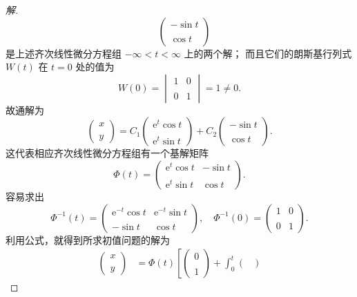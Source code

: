 \begin{enumerate}
\begin{proof}[解]
\[\quad\begin{pmatrix}-\sin t \\ \\ \cos t\end{pmatrix}\]
是上述齐次线性微分方程组 $-\infty<t<\infty$ 上的两个解；
而且它们的朗斯基行列式 $W(t)$ 在 $t=0$ 处的值为
\[W(0)=\begin{vmatrix}1 & 0 \\ \\ 0 & 1\end{vmatrix}=1 \neq 0.\]
故通解为
\[\begin{pmatrix}x \\ \\ y\end{pmatrix}
=C_{1}\begin{pmatrix}\mathrm{e}^{t} \cos t \\ \\ \mathrm{e}^{t} \sin t\end{pmatrix}
+C_{2}\begin{pmatrix}-\sin t \\ \\ \cos t\end{pmatrix}.\]
这代表相应齐次线性微分方程组有一个基解矩阵
\[\Phi(t)=\begin{pmatrix}
\mathrm{e}^{t}\cos t & -\sin t \\ \\
\mathrm{e}^{t}\sin t & \cos t
\end{pmatrix}.\]
容易求出
$$\Phi^{-1}(t)=\begin{pmatrix}
\mathrm{e}^{-t} \cos t & \mathrm{e}^{-t} \sin t \\ \\
-\sin t & \cos t\end{pmatrix}, 
\quad \Phi^{-1}(0)=\begin{pmatrix}1 & 0 \\ \\0 & 1\end{pmatrix}.$$
利用公式，就得到所求初值问题的解为
\begin{align*}
\begin{pmatrix}x \\ \\ y\end{pmatrix} & 
=\Phi(t)\left[\begin{pmatrix}0 \\ \\ 1\end{pmatrix}
+\int_{0}^{t}\begin{pmatrix}

\end{pmatrix}
\end{align*}
\end{proof}
\end{enumerate}
